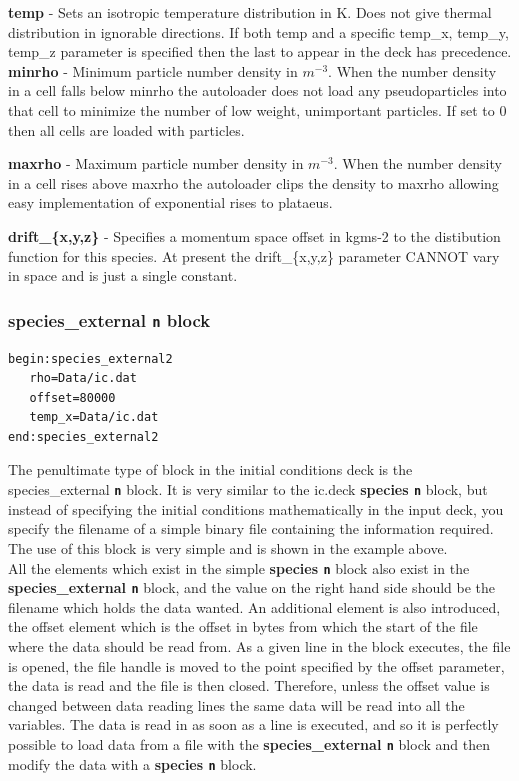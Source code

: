 \documentclass[12pt,a4paper]{article}
\newcommand{\emphtext}{\color{warwickdark} \fontfamily{phv}\selectfont\Large\bf}
\newcommand{\boxverbatim}[1]{\begin{Verbatim}[obeytabs=true,frame=single,
  framerule=0.5mm,rulecolor=\color{warwickmid},formatcom=\color{black},label=#1]}
\newcommand{\inlinecode}[1]{{\color{warwickred} \bf\texttt{#1}}}
\newcommand{\inlineemph}[1]{{\color{warwicklight} \bf{#1}}}
\begin{document}
{\emphtext temp} - Sets an isotropic temperature distribution in K. Does not
give thermal distribution in ignorable directions. If both temp and a specific
temp\_x, temp\_y, temp\_z parameter is specified then the last to appear in the
deck has precedence.\\

{\emphtext minrho} - Minimum particle number density in $m^{-3}$. When the
number density in a cell falls below minrho the autoloader does not load any
pseudoparticles into that cell to minimize the number of low weight,
unimportant particles. If set to 0 then all cells are loaded with particles.

{\emphtext maxrho} - Maximum particle number density in $m^{-3}$. When the
number density in a cell rises above maxrho the autoloader clips the density to
maxrho allowing easy implementation of exponential rises to plataeus.

{\emphtext drift\_\{x,y,z\}} - Specifies a momentum space offset in kgms-2 to
the distibution function for this species. At present the drift\_\{x,y,z\}
parameter CANNOT vary in space and is just a single constant.

\subsubsection{\inlineemph{species\_external\inlinecode{n}} block}
\boxverbatim{species\_external{\it n} block}
begin:species_external2
   rho=Data/ic.dat
   offset=80000
   temp_x=Data/ic.dat
end:species_external2
\end{Verbatim}

The penultimate type of block in the initial conditions deck is the
species\_external\inlinecode{n} block. It is very similar to the ic.deck
\inlineemph{species\inlinecode{n}} block, but instead of specifying the
initial conditions mathematically in the input deck, you specify the filename
of a simple binary file containing the information required. The use of this
block is very simple and is shown in the example above.\\

All the elements which exist in the simple \inlineemph{species\inlinecode{n}}
block also exist in the \inlineemph{species\_external\inlinecode{n}} block,
and the value on the right hand side should be the filename which holds the
data wanted. An additional element is also introduced, the offset element which
is the offset in bytes from which the start of the file where the data should
be read from. As a given line in the block executes, the file is opened, the
file handle is moved to the point specified by the offset parameter, the data
is read and the file is then closed. Therefore, unless the offset value is
changed between data reading lines the same data will be read into all the
variables. The data is read in as soon as a line is executed, and so it is
perfectly possible to load data from a file with the
\inlineemph{species\_external\inlinecode{n}} block and then modify the data
with a \inlineemph{species\inlinecode{n}} block.\\
\end{document}

